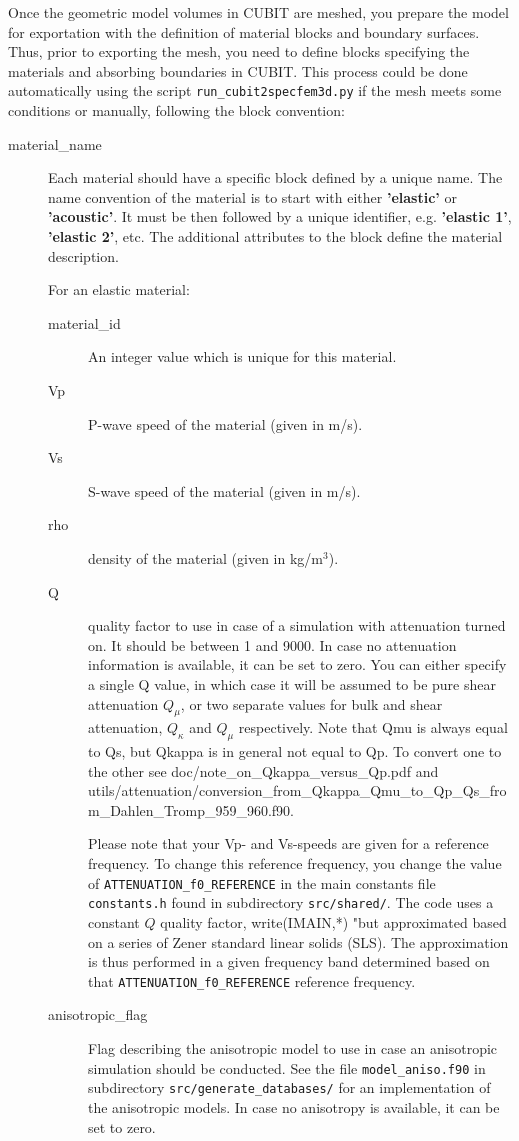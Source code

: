 Once the geometric model volumes in CUBIT are meshed, you prepare
the model for exportation with the definition of material blocks and
boundary surfaces. Thus, prior to exporting the mesh, you need to
define blocks specifying the materials and absorbing boundaries in
CUBIT. This process could be done automatically using the script \texttt{run\_cubit2specfem3d.py}
if the mesh meets some conditions or manually, following the block
convention:
\begin{description}
\item [{material\_name}] Each material should have a specific block defined
by a unique name. The name convention of the material is to start
with either \textbf{'elastic'} or \textbf{'acoustic'}. It must be then followed by a
unique identifier, e.g. \textbf{'elastic 1'}, \textbf{'elastic 2'}, etc. The additional
attributes to the block define the material description.


For an elastic material:
\begin{description}
\item [{material\_id}] An integer value which is unique for this material.
\item [{Vp}] P-wave speed of the material (given in m/s).
\item [{Vs}] S-wave speed of the material (given in m/s).
\item [{rho}] density of the material (given in kg/m$^{3}$).
\item [{Q}] quality factor to use in case of a simulation with attenuation
turned on. It should be between 1 and 9000. In case no attenuation
information is available, it can be set to zero. You can either specify a single Q value,
in which case it will be assumed to be pure shear attenuation $Q_{\mu}$, or two
separate values for bulk and shear attenuation, $Q_{\kappa}$ and $Q_{\mu}$ respectively.
Note that Qmu is always equal to Qs, but Qkappa is in general not equal to Qp. To convert one to the other see doc/note\_on\_Qkappa\_versus\_Qp.pdf and utils/attenuation/conversion\_from\_Qkappa\_Qmu\_to\_Qp\_Qs\_from\_Dahlen\_Tromp\_959\_960.f90.

Please note that your Vp- and Vs-speeds are given for a reference frequency. To change
this reference frequency, you change the value of \texttt{ATTENUATION\_f0\_REFERENCE}
in the main constants file \texttt{constants.h} found in subdirectory
\texttt{src/shared/}.
The code uses a constant $Q$ quality factor, write(IMAIN,*) "but approximated based on a series of Zener standard linear solids (SLS).
The approximation is thus performed in a given frequency band determined based on that \texttt{ATTENUATION\_f0\_REFERENCE} reference frequency.
\item [{anisotropic\_flag}] Flag describing the anisotropic model to use
in case an anisotropic simulation should be conducted. See the file
\texttt{model\_aniso.f90} in subdirectory \texttt{src/generate\_databases/}
for an implementation of the anisotropic models. In case no anisotropy
is available, it can be set to zero.
\end{description}


\end{description}
